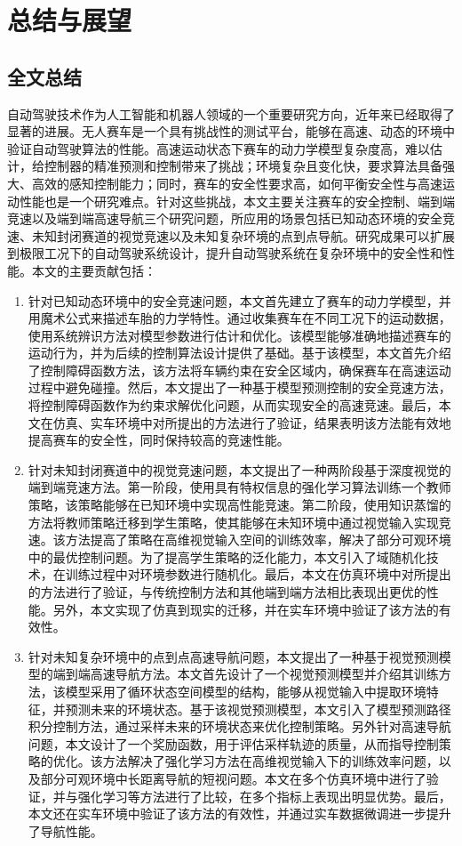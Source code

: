 \chapter{总结与展望}
\section{全文总结}
自动驾驶技术作为人工智能和机器人领域的一个重要研究方向，近年来已经取得了显著的进展。无人赛车是一个具有挑战性的测试平台，能够在高速、动态的环境中验证自动驾驶算法的性能。高速运动状态下赛车的动力学模型复杂度高，难以估计，给控制器的精准预测和控制带来了挑战；环境复杂且变化快，要求算法具备强大、高效的感知控制能力；同时，赛车的安全性要求高，如何平衡安全性与高速运动性能也是一个研究难点。针对这些挑战，本文主要关注赛车的安全控制、端到端竞速以及端到端高速导航三个研究问题，所应用的场景包括已知动态环境的安全竞速、未知封闭赛道的视觉竞速以及未知复杂环境的点到点导航。研究成果可以扩展到极限工况下的自动驾驶系统设计，提升自动驾驶系统在复杂环境中的安全性和性能。本文的主要贡献包括：

\begin{enumerate}
    \item 针对已知动态环境中的安全竞速问题，本文首先建立了赛车的动力学模型，并用魔术公式来描述车胎的力学特性。通过收集赛车在不同工况下的运动数据，使用系统辨识方法对模型参数进行估计和优化。该模型能够准确地描述赛车的运动行为，并为后续的控制算法设计提供了基础。基于该模型，本文首先介绍了控制障碍函数方法，该方法将车辆约束在安全区域内，确保赛车在高速运动过程中避免碰撞。然后，本文提出了一种基于模型预测控制的安全竞速方法，将控制障碍函数作为约束求解优化问题，从而实现安全的高速竞速。最后，本文在仿真、实车环境中对所提出的方法进行了验证，结果表明该方法能有效地提高赛车的安全性，同时保持较高的竞速性能。
    \item 针对未知封闭赛道中的视觉竞速问题，本文提出了一种两阶段基于深度视觉的端到端竞速方法。第一阶段，使用具有特权信息的强化学习算法训练一个教师策略，该策略能够在已知环境中实现高性能竞速。第二阶段，使用知识蒸馏的方法将教师策略迁移到学生策略，使其能够在未知环境中通过视觉输入实现竞速。该方法提高了策略在高维视觉输入空间的训练效率，解决了部分可观环境中的最优控制问题。为了提高学生策略的泛化能力，本文引入了域随机化技术，在训练过程中对环境参数进行随机化。最后，本文在仿真环境中对所提出的方法进行了验证，与传统控制方法和其他端到端方法相比表现出更优的性能。另外，本文实现了仿真到现实的迁移，并在实车环境中验证了该方法的有效性。
    \item 针对未知复杂环境中的点到点高速导航问题，本文提出了一种基于视觉预测模型的端到端高速导航方法。本文首先设计了一个视觉预测模型并介绍其训练方法，该模型采用了循环状态空间模型的结构，能够从视觉输入中提取环境特征，并预测未来的环境状态。基于该视觉预测模型，本文引入了模型预测路径积分控制方法，通过采样未来的环境状态来优化控制策略。另外针对高速导航问题，本文设计了一个奖励函数，用于评估采样轨迹的质量，从而指导控制策略的优化。该方法解决了强化学习方法在高维视觉输入下的训练效率问题，以及部分可观环境中长距离导航的短视问题。本文在多个仿真环境中进行了验证，并与强化学习等方法进行了比较，在多个指标上表现出明显优势。最后，本文还在实车环境中验证了该方法的有效性，并通过实车数据微调进一步提升了导航性能。
\end{enumerate}
